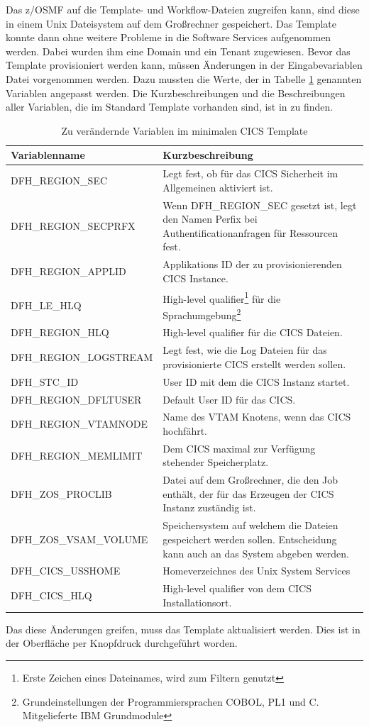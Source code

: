Das z/OSMF auf die Template- und Workflow-Dateien zugreifen kann, sind diese in einem Unix Dateisystem auf dem Großrechner gespeichert.
Das Template konnte dann ohne weitere Probleme in die Software Services aufgenommen werden.
Dabei wurden ihm eine Domain und ein Tenant zugewiesen.
Bevor das Template provisioniert werden kann, müssen Änderungen in der Eingabevariablen Datei vorgenommen werden.
Dazu mussten die Werte, der in Tabelle \ref{tab:cgsvars} genannten Variablen angepasst werden.
Die Kurzbeschreibungen und die Beschreibungen aller Variablen, die im Standard Template vorhanden sind, ist in \cite{IBM.2019} zu finden.
\begin{table}
\centering
\begin{tabularx}{\textwidth}{X|X}
Variablenname & Kurzbeschreibung \\
\hline
DFH\_REGION\_SEC & Legt fest, ob für das CICS Sicherheit im Allgemeinen aktiviert ist. \\
\hline
DFH\_REGION\_SECPRFX & Wenn DFH\_REGION\_SEC gesetzt ist, legt den Namen Perfix bei Authentificationanfragen für Ressourcen fest. \\
\hline
DFH\_REGION\_APPLID & Applikations ID der zu provisionierenden CICS Instance. \\
\hline
DFH\_LE\_HLQ & High-level qualifier\footnote{Erste Zeichen eines Dateinames, wird zum Filtern genutzt} für die Sprachumgebung\footnote{Grundeinstellungen der Programmiersprachen COBOL, PL1 und C. Mitgelieferte IBM Grundmodule} \\
\hline
DFH\_REGION\_HLQ & High-level qualifier für die CICS Dateien.\\
\hline
DFH\_REGION\_LOGSTREAM & Legt fest, wie die Log Dateien für das provisionierte CICS erstellt werden sollen. \\
\hline
DFH\_STC\_ID & User ID mit dem die CICS Instanz startet. \\
\hline
DFH\_REGION\_DFLTUSER & Default User ID für das CICS. \\
\hline
DFH\_REGION\_VTAMNODE & Name des VTAM Knotens, wenn das CICS hochfährt. \\
\hline
DFH\_REGION\_MEMLIMIT & Dem CICS maximal zur Verfügung stehender Speicherplatz. \\
\hline
DFH\_ZOS\_PROCLIB & Datei auf dem Großrechner, die den Job enthält, der für das Erzeugen der CICS Instanz zuständig ist. \\
\hline
DFH\_ZOS\_VSAM\_VOLUME & Speichersystem auf welchem die Dateien gespeichert werden sollen. Entscheidung kann auch an das System abgeben werden. \\
\hline
DFH\_CICS\_USSHOME & Homeverzeichnes des Unix System Services \\
\hline
DFH\_CICS\_HLQ & High-level qualifier von dem CICS Installationsort. \\
\end{tabularx}
\caption{Zu verändernde Variablen im minimalen CICS Template}
\label{tab:cgsvars}
\end{table}
Das diese Änderungen greifen, muss das Template aktualisiert werden.
Dies ist in der Oberfläche per Knopfdruck durchgeführt worden.

